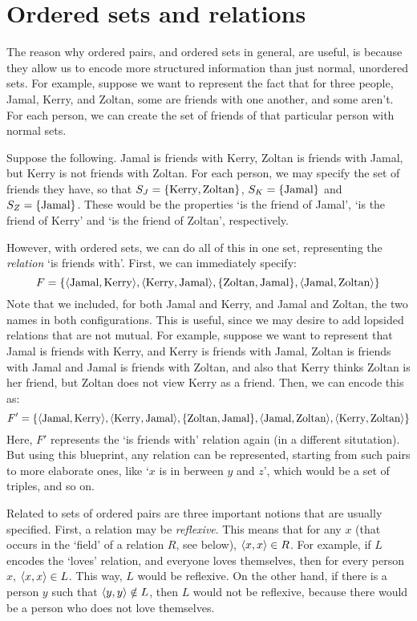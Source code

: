 \section{Ordered sets and relations}

The reason why ordered pairs, and ordered sets in general, are useful, is because they allow us to encode more structured information than just normal, unordered sets. For example, suppose we want to represent the fact that for three people, Jamal, Kerry, and Zoltan, some are friends with one another, and some aren't. For each person, we can create the set of friends of that particular person with normal sets. 

Suppose the following. Jamal is friends with Kerry, Zoltan is friends with Jamal, but Kerry is not friends with Zoltan. For each person, we may specify the set of friends they have, so that $S_J=\{\text{Kerry}, \text{Zoltan}\}$, $S_K=\{\text{Jamal}\}$ and $S_Z=\{\text{Jamal}\}$. These would be the properties `is the friend of Jamal', `is the friend of Kerry' and `is the friend of Zoltan', respectively. 

However, with ordered sets, we can do all of this in one set, representing the \textit{relation} `is friends with'. First, we can immediately specify: 
%
\[F=\{\langle\text{Jamal}, \text{Kerry}\rangle, \langle\text{Kerry}, \text{Jamal}\rangle, \{\text{Zoltan}, \text{Jamal}\}, \langle\text{Jamal}, \text{Zoltan}\rangle\}\]
%
Note that we included, for both Jamal and Kerry, and Jamal and Zoltan, the two names in both configurations. This is useful, since we may desire to add lopsided relations that are not mutual. For example, suppose we want to represent that Jamal is friends with Kerry, and Kerry is friends with Jamal, Zoltan is friends with Jamal and Jamal is friends with Zoltan, and also that Kerry thinks Zoltan is her friend, but Zoltan does not view Kerry as a friend. Then, we can encode this as: 
%
\[F'=\{\langle\text{Jamal}, \text{Kerry}\rangle, \langle\text{Kerry}, \text{Jamal}\rangle, \{\text{Zoltan}, \text{Jamal}\}, \langle\text{Jamal}, \text{Zoltan}\rangle, \langle\text{Kerry}, \text{Zoltan}\rangle\}\]
%
Here, $F'$ represents the `is friends with' relation again (in a different situtation). But using this blueprint, any relation can be represented, starting from such pairs to more elaborate ones, like `$x$ is in berween $y$ and $z$', which would be a set of triples, and so on. 

Related to sets of ordered pairs are three important notions that are usually specified. First, a relation may be \textit{reflexive}. This means that for any $x$ (that occurs in the `field' of a relation $R$, see below), $\langle x, x\rangle \in R$. For example, if $L$ encodes the `loves' relation, and everyone loves themselves, then for every person $x$, $\langle x, x\rangle \in L$. This way, $L$ would be reflexive. On the other hand, if there is a person $y$ such that $\langle y, y\rangle \notin L$, then $L$ would not be reflexive, because there would be a person who does not love themselves. 

